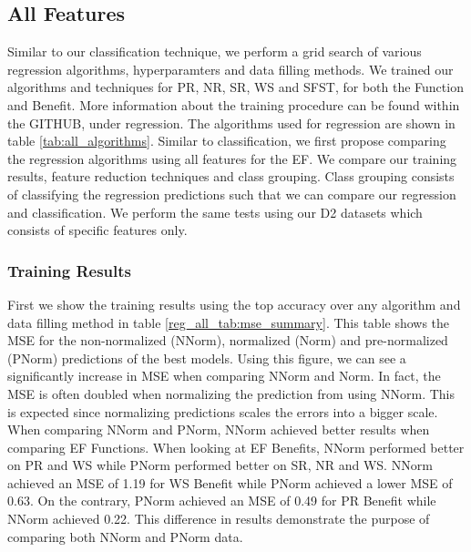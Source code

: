 \documentclass[12pt,letterpaper]{article}
\begin{document}
\subsection{All Features}
Similar to our classification technique, we perform a grid search of various regression algorithms, hyperparamters and data filling methods.
We trained our algorithms and techniques for \ac{PR}, \ac{NR}, \ac{SR}, \ac{WS} and \ac{SFST}, for both the Function and Benefit.
More information about the training procedure can be found within the GITHUB, under regression.
The algorithms used for regression are shown in table \ref{tab:all_algorithms}.
Similar to classification, we first propose comparing the regression algorithms using all features for the \ac{EF}.
We compare our training results, feature reduction techniques and class grouping.
Class grouping consists of classifying the regression predictions such that we can compare our regression and classification.
We perform the same tests using our D2 datasets which consists of specific features only.

\subsubsection{Training Results}
First we show the training results using the top accuracy over any algorithm and data filling method in table \ref{reg_all_tab:mse_summary}.
This table shows the MSE for the non-normalized (NNorm), normalized (Norm) and pre-normalized (PNorm) predictions of the best models.
Using this figure, we can see a significantly increase in MSE when comparing NNorm and Norm.
In fact, the MSE is often doubled when normalizing the prediction from using NNorm.
This is expected since normalizing predictions scales the errors into a bigger scale.
When comparing NNorm and PNorm, NNorm achieved better results when comparing \ac{EF} Functions.
When looking at \ac{EF} Benefits, NNorm performed better on \ac{PR} and \ac{WS} while PNorm performed better on \ac{SR}, \ac{NR} and \ac{WS}. 
NNorm achieved an MSE of 1.19 for \ac{WS} Benefit while PNorm achieved a lower MSE of 0.63.
On the contrary, PNorm achieved an MSE of 0.49 for \ac{PR} Benefit while NNorm achieved 0.22.
This difference in results demonstrate the purpose of comparing both NNorm and PNorm data. 
\end{document}
